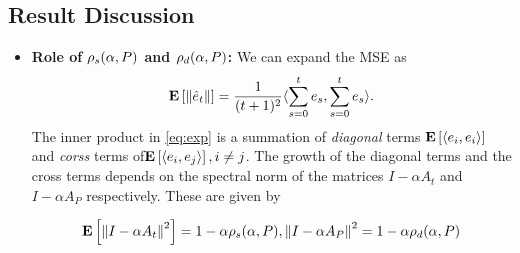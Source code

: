 \subsection{Result Discussion}
\begin{itemize}[leftmargin=*, before = \leavevmode\vspace{-\baselineskip}]
\item \textbf{Role of $\rho_s(\alpha,P)$ and $\rho_d(\alpha,P)$:} We can expand the MSE as \begin{align}\label{eq:exp}\mathbf{E}\left[\left\| \hat{e}_t\right\|\right]=\frac{1}{(t+1)^2}\langle\sum_{s=0}^t e_s,\sum_{s=0}^t e_s\rangle.\end{align} The inner product in \eqref{eq:exp} is a summation of \emph{diagonal} terms $\mathbf{E}\left[\langle e_i,e_i\rangle\right]$ and \emph{corss} terms of$\mathbf{E}\left[\langle e_i,e_j\rangle\right],i\neq j$. The growth of the diagonal terms and the cross terms depends on the spectral norm of the matrices $I-\alpha A_t$ and $I-\alpha A_P$ respectively. These are given by
\begin{comment}
The output $\thh_t$ of the algorithm \eqref{eq:lsa} is the average of the internal states at times $s=0,\ldots,t-1$. The error dynamics of the internal states by looking at the behavior of $e_t\eqdef \theta_t-\ts$.
\begin{align}\label{eq:errec}
\theta_t&=\theta_{t-1}+\alpha(b_t-A_t\theta_{t-1})\nn\\
\theta_t-\ts&=\theta_{t-1}-\ts+\alpha\left(b_t-A_t(\theta_{t-1}-\ts+\ts)\right)\nn\\
e_t&=e_{t-1}+\alpha(b_t-A_t e_t -A_t\ts)\nn\\
e_t&=\underbrace{((I-\alpha A_t))}_{\text{Random-Matrix}} e_{t-1}+\underbrace{\alpha(N_t -(M_t)\ts)}_{\text{Noise}}
\end{align}
From \eqref{errec} it is clear that the error dynamics depends on the $i)$ properties of the random matrix, $ii)$ properties of the noise. In the absence of the noise term in \eqref{eq:errec}, we have $e_t=(I-\alpha A_t) e_{t-1}=\Pi_{s=1}(I-\alpha A_s) e_0$, i.e., the inital error is get multiplied by a product of random matrices. In such a scenario, we can guess that whether or not the algorithm forgets the bias $\norm{\theta_0-\ts}$, depends on whether the matrix product is contracting. One way to characterize this contracting property is to look at the spectral radius of the random matrix, which is given by
\end{comment}
\begin{align}\label{eq:spectralrand}
\EE{\norm{I-\alpha A_t}^2}=1-\alpha \rhos{P}, {\norm{I-\alpha A_P}^2}=1-\alpha \rhod{P}

\end{align}
\end{itemize}
